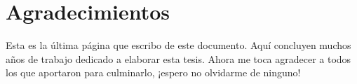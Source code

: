 \vfill
\cleardoublepage

\mtcaddchapter[Agradecimientos]	

\newenvironment{myindentpar}[1]%
  {\begin{list}{}%
          {\setlength{\leftmargin}{#1}}%
          \item[]%
  }
  {\end{list}}

\section*{\centering Agradecimientos} 

\noindent Esta es la última página que escribo de este documento. Aquí concluyen muchos años de trabajo dedicado a elaborar esta tesis. Ahora me toca agradecer a todos los que aportaron para culminarlo, ¡espero no olvidarme de ninguno!

